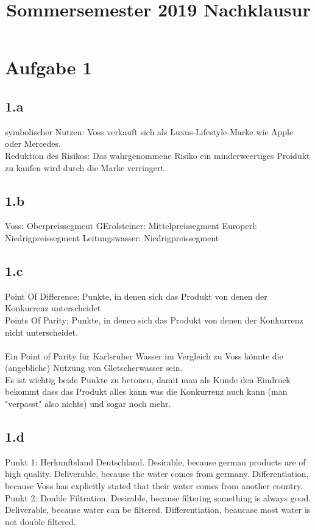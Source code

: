 

\title{Sommersemester 2019 Nachklausur}
\maketitle



\section{Aufgabe 1}
\subsection{1.a}
    symbolischer Nutzen: Voss verkauft sich als Luxus-Lifestyle-Marke wie Apple oder Mercedes. \\
    Reduktion des Risikos: Das wahrgenommene Risiko ein minderweertiges Proidukt zu kaufen wird durch die Marke verringert.

\subsection{1.b}
    Voss: Oberpreissegment
    GErolsteiner: Mittelpreissegment
    Europerl: Niedrigpreissegment
    Leitungswasser: Niedrigpreissegment

\subsection{1.c}
    Point Of Difference: Punkte, in denen sich das Produkt von denen der Konkurrenz unterscheidet \\
    Points Of Parity: Punkte, in denen sich das Produkt von denen der Konkurrenz nicht unterscheidet. \\
    \ \\
    Ein Point of Parity für Karlsruher Wasser im Vergleich zu Voss könnte die (angebliche) Nutzung von Gletscherwasser sein. \\
    Es ist wichtig beide Punkte zu betonen, damit man als Kunde den Eindruck bekommt dass das Produkt alles kann was die Konkurrenz auch kann (man "verpasst" also nichts) und sogar noch mehr. \\

\subsection{1.d}
    Punkt 1: Herkunftsland Deutschland. Desirable, because german products are of high quality. Deliverable, because the water comes from germany. Differentiation, because Voss has explicitly stated that their water comes from another country. \\
    Punkt 2: Double Filtration. Desirable, because filtering something is always good. Deliverable, because water can be filtered. Differentiation, beaucase most water is not double filtered. \\
    


